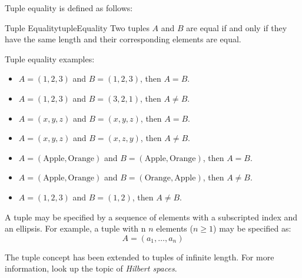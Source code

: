 Tuple equality is defined as follows:
\begin{definition}{Tuple Equality}{tupleEquality}
  Two tuples \( A \) and \( B \) are equal if and only if they have the same length and
  their corresponding elements are equal.
\end{definition}
Tuple equality examples:
\begin{itemize}
  \item \( A = (1, 2, 3) \) and \( B = (1, 2, 3) \), then \( A = B \).
  \item \( A = (1, 2, 3) \) and \( B = (3, 2, 1) \), then \( A \neq B \).
  \item \( A = (x, y, z) \) and \( B = (x, y, z) \), then \( A = B \).
  \item \( A = (x, y, z) \) and \( B = (x, z, y) \), then \( A \neq B \).
  \item \( A = (\text{Apple}, \text{Orange}) \) and \( B = (\text{Apple}, \text{Orange}) \), then \( A = B \).
  \item \( A = (\text{Apple}, \text{Orange}) \) and \( B = (\text{Orange}, \text{Apple}) \), then \( A \neq B \).
  \item \( A = (1, 2, 3) \) and \( B = (1, 2) \), then \( A \neq B \).
\end{itemize}

A tuple may be specified by a sequence of elements with a subscripted index and an ellipsis.
For example, a tuple with n
\(n\) elements (\( n \ge 1\)) may be specified as:
\[
  A = (a_1, \ldots, a_n)
\]

\begin{advancedTopic}
  The tuple concept has been extended to tuples of infinite length. For more
  information, look up the topic of \emph{Hilbert spaces}.
\end{advancedTopic}
